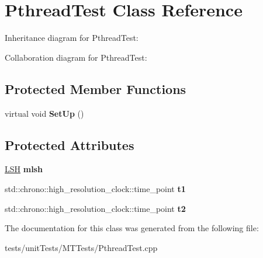 \hypertarget{classPthreadTest}{}\section{Pthread\+Test Class Reference}
\label{classPthreadTest}


Inheritance diagram for Pthread\+Test\+:


Collaboration diagram for Pthread\+Test\+:
\subsection*{Protected Member Functions}
\begin{DoxyCompactItemize}
\item 
virtual void {\bfseries Set\+Up} ()\hypertarget{classPthreadTest_a9476de772b5a46362cf992bc085525da}{}\label{classPthreadTest_a9476de772b5a46362cf992bc085525da}

\end{DoxyCompactItemize}
\subsection*{Protected Attributes}
\begin{DoxyCompactItemize}
\item 
\hyperlink{classLSH}{L\+SH} {\bfseries mlsh}\hypertarget{classPthreadTest_a8ae1b5b08ee0ba6c746e454a9b95c5a1}{}\label{classPthreadTest_a8ae1b5b08ee0ba6c746e454a9b95c5a1}

\item 
std\+::chrono\+::high\+\_\+resolution\+\_\+clock\+::time\+\_\+point {\bfseries t1}\hypertarget{classPthreadTest_a55d97c54464d2663314775bee93d18f3}{}\label{classPthreadTest_a55d97c54464d2663314775bee93d18f3}

\item 
std\+::chrono\+::high\+\_\+resolution\+\_\+clock\+::time\+\_\+point {\bfseries t2}\hypertarget{classPthreadTest_afdc12e9ee301789fb730bf0958cf64e2}{}\label{classPthreadTest_afdc12e9ee301789fb730bf0958cf64e2}

\end{DoxyCompactItemize}


The documentation for this class was generated from the following file\+:\begin{DoxyCompactItemize}
\item 
tests/unit\+Tests/\+M\+T\+Tests/Pthread\+Test.\+cpp\end{DoxyCompactItemize}
